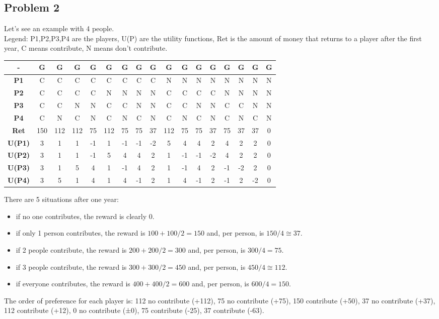 \documentclass{article}
\begin{document}
\subsection{Problem 2}
Let's see an example with 4 people.\\
Legend: P1,P2,P3,P4 are the players, U(P) are the utility functions, Ret is the amount of money that returns to a player after the first year, C means contribute, N means don't contribute.
\begin{center}
\begin{tabular}{|c|c|c|c|c|c|c|c|c|c|c|c|c|c|c|c|c|}
    \hline
    \textbf{-} & \textbf{G} & \textbf{G} & \textbf{G} & \textbf{G} & \textbf{G} & \textbf{G} & \textbf{G} & \textbf{G} & \textbf{G} & \textbf{G} & \textbf{G} & \textbf{G} & \textbf{G} & \textbf{G} & \textbf{G} & \textbf{G} \\ \hline
    \textbf{P1} & C & C & C & C & C & C & C & C & N & N & N & N & N & N & N & N \\ \hline
    \textbf{P2} & C & C & C & C & N & N & N & N & C & C & C & C & N & N & N & N \\ \hline
    \textbf{P3} & C & C & N & N & C & C & N & N & C & C & N & N & C & C & N & N \\ \hline
    \textbf{P4} & C & N & C & N & C & N & C & N & C & N & C & N & C & N & C & N \\ \hline
    \textbf{Ret} & 150 & 112 & 112 & 75 & 112 & 75 & 75 & 37 & 112 & 75 & 75 & 37 & 75 & 37 & 37 & 0 \\ \hline
    \textbf{U(P1)} & 3 & 1 & 1 & -1 & 1 & -1 & -1 & -2 & 5 & 4 & 4 & 2 & 4 & 2 & 2 & 0 \\ \hline
    \textbf{U(P2)} & 3 & 1 & 1 & -1 & 5 & 4 & 4 & 2 & 1 & -1 & -1 & -2 & 4 & 2 & 2 & 0 \\ \hline
    \textbf{U(P3)} & 3 & 1 & 5 & 4 & 1 & -1 & 4 & 2 & 1 & -1 & 4 & 2 & -1 & -2 & 2 & 0 \\ \hline
    \textbf{U(P4)} & 3 & 5 & 1 & 4 & 1 & 4 & -1 & 2 & 1 & 4 & -1 & 2 & -1 & 2 & -2 & 0 \\ 
    \hline
\end{tabular}
\end{center}
There are 5 situations after one year:
\begin{itemize}
    \item if no one contributes, the reward is clearly $0$.
    \item if only 1 person contributes, the reward is $100+100/2=150$ and, per person, is $150/4\cong 37$.
    \item if 2 people contribute, the reward is $200+200/2=300$ and, per person, is $300/4 = 75$.
    \item if 3 people contribute, the reward is $300+300/2=450$ and, per person, is $450/4\cong 112$.
    \item if everyone contributes, the reward is $400+400/2=600$ and, per person, is $600/4 = 150$.
\end{itemize}
The order of preference for each player is:
112 no contribute (+112), 75 no contribute (+75), 150 contribute (+50), 37 no contribute (+37), 112 contribute (+12), 0 no contribute (±0), 75 contribute (-25), 37 contribute (-63).
\end{document}
